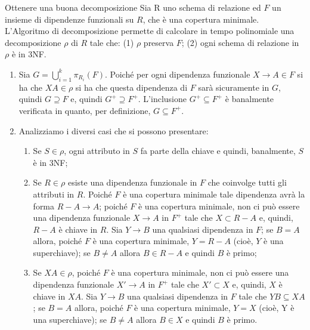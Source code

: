 \begin{Proposition}{Ottenere una buona decomposizione}{}
    Sia R uno schema di relazione ed $F$ un insieme di dipendenze funzionali su $R$, che è una copertura minimale. L'Algoritmo di decomposizione permette di calcolare in tempo polinomiale una decomposizione $\rho$ di $R$ tale che: (1) $\rho$ preserva $F$; (2) ogni schema di relazione in $\rho$ è in 3NF.

    \begin{demonstration}\phantom{}
        \begin{enumerate}
            \item Sia $G=\bigcup^k_{i=1} \pi_{R_i}(F)$. Poiché per ogni dipendenza funzionale $X\to A\in F$ si ha che $XA\in\rho$ si ha che questa dipendenza di $F$ sarà sicuramente in $G$, quindi $G\supseteq F$ e, quindi $G^+\supseteq F^+$. L'inclusione $G^+\subseteq F^+$ è banalmente verificata in quanto, per definizione, $G\subseteq F^+$.

            \item Analizziamo i diversi casi che si possono presentare: 
            \begin{enumerate}
                \item Se $S\in\rho$, ogni attributo in $S$ fa parte della chiave e quindi, banalmente, $S$ è in 3NF; 
            \item Se $R\in\rho$ esiste una dipendenza funzionale in $F$ che coinvolge tutti gli attributi in $R$. Poiché $F$ è una copertura minimale tale dipendenza avrà la forma $R-A\to A$; poiché $F$ è una copertura minimale, non ci può essere una dipendenza funzionale $X\to A$ in $F^+$ tale che $X\subset R-A$ e, quindi, $R-A$ è chiave in $R$. Sia $Y\to B$ una qualsiasi dipendenza in $F$; se $B=A$ allora, poiché $F$ è una copertura minimale, $Y=R-A$ (cioè, $Y$ è una superchiave); se $B\neq A$ allora $B\in R-A$ e quindi $B$ è primo;
            \item Se $XA\in\rho$, poiché $F$ è una copertura minimale, non ci può essere una dipendenza funzionale $X'\to A$ in $F^+$ tale che $X'\subset X$ e, quindi, $X$ è chiave in $XA$. Sia $Y\to B$ una qualsiasi dipendenza in $F$ tale che $YB\subseteq XA$; se $B=A$ allora, poiché $F$ è una copertura minimale, $Y=X$ (cioè, Y è una superchiave); se $B\neq A$ allora $B\in X$ e quindi $B$ è primo.
            \end{enumerate}
        \end{enumerate}
    \end{demonstration}
\end{Proposition}

